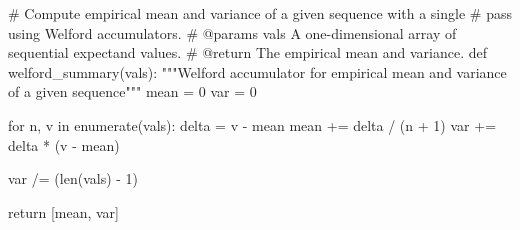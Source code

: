 \documentclass[
  letterpaper,
  DIV=11,
  numbers=noendperiod]{scrartcl}
\newenvironment{Shaded}{\begin{snugshade}}{\end{snugshade}}
\newcommand{\BuiltInTok}[1]{\textcolor[rgb]{0.00,0.23,0.31}{#1}}
\newcommand{\CommentTok}[1]{\textcolor[rgb]{0.37,0.37,0.37}{#1}}
\newcommand{\ControlFlowTok}[1]{\textcolor[rgb]{0.00,0.23,0.31}{#1}}
\newcommand{\DecValTok}[1]{\textcolor[rgb]{0.68,0.00,0.00}{#1}}
\newcommand{\KeywordTok}[1]{\textcolor[rgb]{0.00,0.23,0.31}{#1}}
\newcommand{\NormalTok}[1]{\textcolor[rgb]{0.00,0.23,0.31}{#1}}
\newcommand{\OperatorTok}[1]{\textcolor[rgb]{0.37,0.37,0.37}{#1}}
\begin{document}
\begin{Shaded}
\begin{Highlighting}[]
\CommentTok{\# Compute empirical mean and variance of a given sequence with a single}
\CommentTok{\# pass using Welford accumulators.}
\CommentTok{\# @params vals A one{-}dimensional array of sequential expectand values.}
\CommentTok{\# @return The empirical mean and variance.}
\KeywordTok{def}\NormalTok{ welford\_summary(vals):}
  \CommentTok{"""Welford accumulator for empirical mean and variance of a}
\CommentTok{     given sequence"""}
\NormalTok{  mean }\OperatorTok{=} \DecValTok{0}
\NormalTok{  var }\OperatorTok{=} \DecValTok{0}

  \ControlFlowTok{for}\NormalTok{ n, v }\KeywordTok{in} \BuiltInTok{enumerate}\NormalTok{(vals):}
\NormalTok{    delta }\OperatorTok{=}\NormalTok{ v }\OperatorTok{{-}}\NormalTok{ mean}
\NormalTok{    mean }\OperatorTok{+=}\NormalTok{ delta }\OperatorTok{/}\NormalTok{ (n }\OperatorTok{+} \DecValTok{1}\NormalTok{)}
\NormalTok{    var }\OperatorTok{+=}\NormalTok{ delta }\OperatorTok{*}\NormalTok{ (v }\OperatorTok{{-}}\NormalTok{ mean)}

\NormalTok{  var }\OperatorTok{/=}\NormalTok{ (}\BuiltInTok{len}\NormalTok{(vals) }\OperatorTok{{-}} \DecValTok{1}\NormalTok{)}

  \ControlFlowTok{return}\NormalTok{ [mean, var]}
\end{Highlighting}
\end{Shaded}
\end{document}
